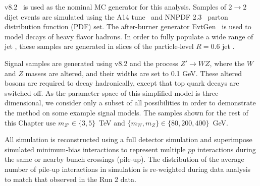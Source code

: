 \PYTHIA{} v8.2~\cite{Sjostrand:2007gs,Sjostrand:2006za} is used as the nominal MC generator for this analysis.
Samples of $2\rightarrow 2$ dijet events are simulated using the A14 tune~\cite{ATL-PHYS-PUB-2014-021} and NNPDF 2.3~\cite{Ball:2012cx} parton distribution function (PDF) set.
The after-burner generator EvtGen~\cite{Lange:2001uf} is used to model decays of heavy flavor hadrons.
In order to fully populate a wide range of jet \pt, these samples are generated in slices of the particle-level $R=0.6$ jet \pt.

Signal samples are generated using \PYTHIA{} v8.2 and the process $Z'\rightarrow WZ$, where the $W$ and $Z$ masses are altered, and their widths are set to 0.1 GeV.
These altered bosons are required to decay hadronically, except that top quark decays are switched off.
As the parameter space of this simplified model is three-dimensional, we consider only a subset of all possibilities in order to demonstrate the method on some example signal models.
The samples shown for the rest of this Chapter use $m_{Z'}\in\{3,5\}$~TeV and $\{m_W,m_Z\}\in\{80,200,400\}$~GeV.

All simulation is reconstructed using a full detector simulation and superimpose simulated minimum-bias interactions to represent multiple $pp$ interactions during the same or nearby bunch crossings (pile-up).
The distribution of the average number of pile-up interactions in simulation is re-weighted during data analysis to match that observed in the Run 2 data.


\clearpage
